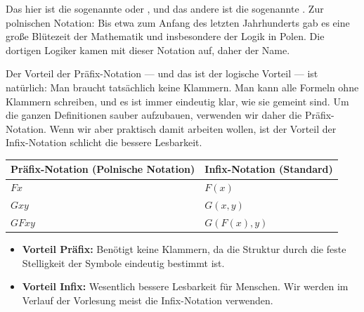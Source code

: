 \begin{spoken-clean}[00:51:29 - 00:55:59]
Das hier ist die sogenannte  oder , und das andere ist die sogenannte . Zur polnischen Notation: Bis etwa zum Anfang des letzten Jahrhunderts gab es eine große Blütezeit der Mathematik und insbesondere der Logik in Polen. Die dortigen Logiker kamen mit dieser Notation auf, daher der Name. 

Der Vorteil der Präfix-Notation --- und das ist der logische Vorteil --- ist natürlich: Man braucht tatsächlich keine Klammern. Man kann alle Formeln ohne Klammern schreiben, und es ist immer eindeutig klar, wie sie gemeint sind. Um die ganzen Definitionen sauber aufzubauen, verwenden wir daher die Präfix-Notation. Wenn wir aber praktisch damit arbeiten wollen, ist der Vorteil der Infix-Notation schlicht die bessere Lesbarkeit.
\end{spoken-clean}

\begin{math-stroke}
\begin{center}
\begin{tabular}{l | l}
    \toprule
    \textbf{Präfix-Notation (Polnische Notation)} & \textbf{Infix-Notation (Standard)} \\ 
    \midrule
    $F x$     & $F(x)$ \\
    $G x y$    & $G(x, y)$ \\
    $G F x y$   & $G(F(x), y)$ \\
    \bottomrule
\end{tabular}
\end{center}

\begin{explanation-of-steps}
\begin{itemize}
    \item \textbf{Vorteil Präfix:} Benötigt keine Klammern, da die Struktur durch die feste Stelligkeit der Symbole eindeutig bestimmt ist.
    \item \textbf{Vorteil Infix:} Wesentlich bessere Lesbarkeit für Menschen. Wir werden im Verlauf der Vorlesung meist die Infix-Notation verwenden.
\end{itemize}
\end{explanation-of-steps}
\end{math-stroke}

